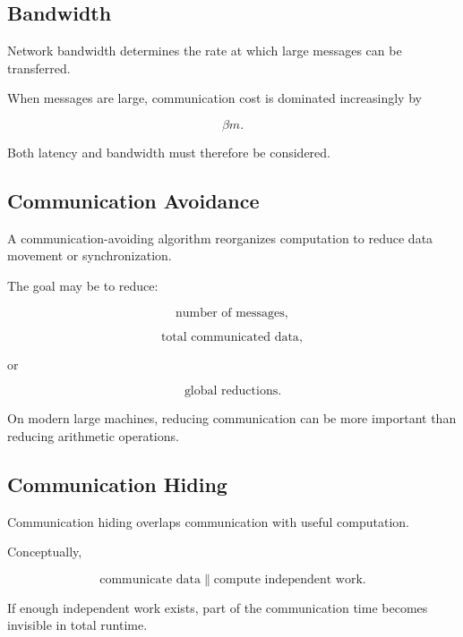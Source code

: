 \subsection{Bandwidth}
\label{subsec:hpmc-network-bandwidth}

Network bandwidth determines the rate at which large messages can be
transferred.

When messages are large, communication cost is dominated increasingly by

\[
\boxed{
\beta m.
}
\]

Both latency and bandwidth must therefore be considered.

\subsection{Communication Avoidance}
\label{subsec:communication-avoidance}

A communication-avoiding algorithm reorganizes computation to reduce data
movement or synchronization.

The goal may be to reduce:

\[
\boxed{
\text{number of messages},
}
\]

\[
\boxed{
\text{total communicated data},
}
\]

or

\[
\boxed{
\text{global reductions}.
}
\]

On modern large machines, reducing communication can be more important than
reducing arithmetic operations.

\subsection{Communication Hiding}
\label{subsec:communication-hiding}

Communication hiding overlaps communication with useful computation.

Conceptually,

\[
\boxed{
\text{communicate data}
\parallel
\text{compute independent work}.
}
\]

If enough independent work exists, part of the communication time becomes
invisible in total runtime.

